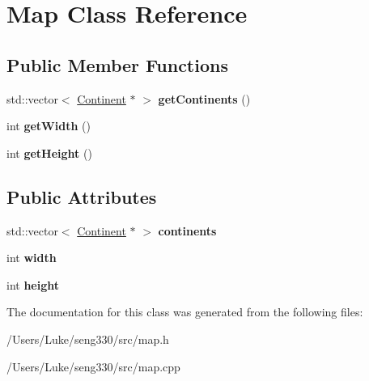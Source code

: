 \hypertarget{class_map}{}\section{Map Class Reference}
\label{class_map}
\subsection*{Public Member Functions}
\begin{DoxyCompactItemize}
\item 
\hypertarget{class_map_ad86eaa5a96061d9947535e2dd0177e2d}{}std\+::vector$<$ \hyperlink{class_continent}{Continent} $\ast$ $>$ {\bfseries get\+Continents} ()\label{class_map_ad86eaa5a96061d9947535e2dd0177e2d}

\item 
\hypertarget{class_map_afd34d12227676b3cebeed9f5fae2508f}{}int {\bfseries get\+Width} ()\label{class_map_afd34d12227676b3cebeed9f5fae2508f}

\item 
\hypertarget{class_map_a2b09c8875af2efb711fc3a022e70427d}{}int {\bfseries get\+Height} ()\label{class_map_a2b09c8875af2efb711fc3a022e70427d}

\end{DoxyCompactItemize}
\subsection*{Public Attributes}
\begin{DoxyCompactItemize}
\item 
\hypertarget{class_map_a7054da19fdc493843a74e57cb536317b}{}std\+::vector$<$ \hyperlink{class_continent}{Continent} $\ast$ $>$ {\bfseries continents}\label{class_map_a7054da19fdc493843a74e57cb536317b}

\item 
\hypertarget{class_map_a9ecfe932ad2d2bc22492416033bdacfd}{}int {\bfseries width}\label{class_map_a9ecfe932ad2d2bc22492416033bdacfd}

\item 
\hypertarget{class_map_a0546fef98caebe38385bb2e0c7a15da1}{}int {\bfseries height}\label{class_map_a0546fef98caebe38385bb2e0c7a15da1}

\end{DoxyCompactItemize}


The documentation for this class was generated from the following files\+:\begin{DoxyCompactItemize}
\item 
/\+Users/\+Luke/seng330/src/map.\+h\item 
/\+Users/\+Luke/seng330/src/map.\+cpp\end{DoxyCompactItemize}
